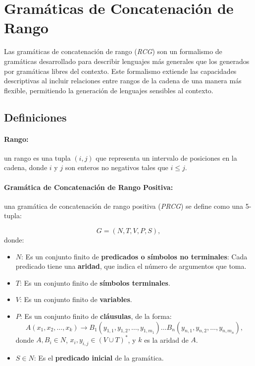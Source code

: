 \documentclass{article}
\begin{document}
\section{Gramáticas de Concatenación de Rango}

Las gramáticas de concatenación de rango (\textit{RCG}) son un formalismo de gramáticas desarrollado para describir lenguajes más generales que los generados por gramáticas libres del contexto.
Este formalismo extiende las capacidades descriptivas al incluir relaciones entre rangos de la cadena de una manera más flexible,
permitiendo la generación de lenguajes sensibles al contexto.

\subsection{Definiciones}

\paragraph{Rango:} un rango es una tupla $(i, j)$ que representa un intervalo de posiciones en la cadena, donde $i$ y $j$ son enteros no negativos tales que $i \leq j$.

\paragraph{Gramática de Concatenación de Rango Positiva:} una gramática de concatenación de rango positiva (\textit{PRCG}) se define como una 5-tupla:

\[
      G = (N, T, V, P, S),
\]
donde:

\begin{itemize}
      \item $N$: Es un conjunto finito de \textbf{predicados o símbolos no terminales}: Cada predicado tiene una \textbf{aridad}, que indica el número de argumentos que toma.
      \item $T$: Es un conjunto finito de \textbf{símbolos terminales}.
      \item $V$: Es un conjunto finito de \textbf{variables}.
      \item $P$: Es un conjunto finito de \textbf{cláusulas}, de la forma:
            \[
                  A(x_1, x_2, \ldots, x_k) \to B_1(y_{1,1}, y_{1,2}, \ldots, y_{1,m_1}) \ldots B_n(y_{n,1}, y_{n,2}, \ldots, y_{n,m_n}),
            \]
            donde $A, B_i \in N$, $x_i, y_{i,j} \in (V \cup T)^*$, y $k$ es la aridad de $A$.
      \item $S \in N$: Es el \textbf{predicado inicial} de la gramática.
\end{itemize}
\end{document}
